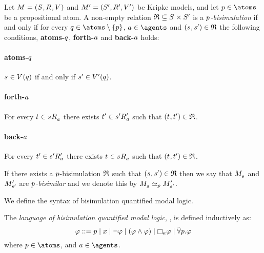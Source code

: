 \begin{definition}
Let $\kModelAndTuple$ and $\kModelAndTupleP$ be Kripke models, and let $\atomP \in \atoms$ be a propositional atom.
A non-empty relation $\bisimulation \subseteq \kStates \times \kStatesP$ is a {\em $p$-bisimulation} if and only if for every $\atomQ \in \atoms \setminus \{\atomP\}$, $\agentA \in \agents$ and $(\kStateS, \kStateSP) \in \bisimulation$ the following conditions, {\bf atoms-$q$}, {\bf forth-$a$} and {\bf back-$a$} holds:

\paragraph{atoms-$q$}
$\kStateS \in \kValuation(\atomQ)$ if and only if ${s}^{\prime} \in {V^{\prime}}(q)$.

\paragraph{forth-$a$}
For every $\kStateT \in \kSuccessorsA{\kStateS}$ there exists ${t}^{\prime} \in {{s}^{\prime}} {R^{\prime}_{a}}$ such that $(\kStateT, \kStateTP) \in \bisimulation$.

\paragraph{back-$a$}
For every ${t}^{\prime} \in {{s}^{\prime}} {R^{\prime}_{a}}$ there exists $\kStateT \in \kSuccessorsA{\kStateS}$ such that $(\kStateT, \kStateTP) \in \bisimulation$.

If there exists a $p$-bisimulation $\mathfrak{R}$ such that $(\kStateS, \kStateSP) \in \bisimulation$ then we say that $\kPModel{\kStateS}$ and ${M^{\prime}_{{s}^{\prime}}}$ are {\em $p$-bisimilar} and we denote this by $\kPModel{\kStateS} \bisimilar[\atomP] \kPModelP{\kStateSP}$.
\end{definition}

We define the syntax of bisimulation quantified modal logic.

\begin{definition}
The {\em language of bisimulation quantified modal logic}, \langBqml{}, is defined inductively as:
$$
\phi ::= 
    \atomP \mid
    \varX \mid
    \lnot \phi \mid
    (\phi \land \phi) \mid
    \necessaryA \phi \mid
    \allbisimsP \phi
$$
where $\atomP \in \atoms$, and $\agentA \in \agents$.
\end{definition}

